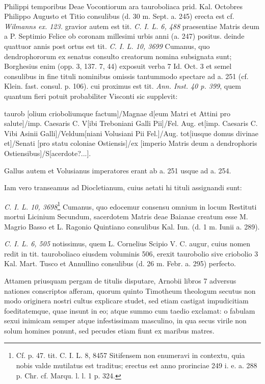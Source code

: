 \documentclass[a4paper, 11pt, oneside, polutonikogreek, german, twocolumn]{article}
\begin{document}
\paragraph{}
Philippi temporibus Deae Vocontiorum ara tauroboliaca prid. Kal. Octobres Philippo Augusto et Titio consulibus (d. 30 m. Sept. a. 245) erecta est cf. \emph{Wilmanns ex. 123.} gravior autem est tit. \emph{C. I. L. 6, 488} praesentiae Matris deum a P. Septimio Felice ob coronam millesimi urbis anni (a. 247) positus. deinde quattuor annis post ortus est tit. \emph{C. I. L. 10, 3699} Cumanus, quo dendrophororum ex senatus consulto creatorum nomina subsignata sunt; Borghesius enim (opp. 3, 137. 7, 44) exposuit verba 7 Id. Oct. 3 et semel consulibus in fine tituli nominibus omissis tantummodo spectare ad a. 251 (cf. Klein. fast. consul. p. 106). cui proximus est tit. \emph{Ann. Inst. 40 p. 399}, quem quantum fieri potuit probabiliter Visconti sic supplevit:

taurob [olium crioboliumque factum]/Magnae d[eum Matri et Attini pro salute]/imp. Caesaris C. V[ibi Treboniani Galli Pii]/Fel. Aug. et[imp. Caesaris C. Vibi Asinii Galli]/Veldum[niani Volusiani Pii Fel.]/Aug. tot[iusque domus divinae et]/Senati [pro statu coloniae Ostiensis]/ex [imperio Matris deum a dendrophoris Ostiensibus]/S[acerdote?...].

Gallus autem et Volusianus imperatores erant ab a. 251 usque ad a. 254.

Iam vero transeamus ad Diocletianum, cuius aetati hi tituli assignandi sunt:

\emph{C. I. L. 10, 3698}\footnote{Cf. p. 47. tit. C. I. L. 8, 8457 Sitifensem non enumeravi in contextu, quia nobis valde mutilatus est traditus; erectus est anno prorinciae 249 i. e. a. 288 p. Chr. cf. Marqu. l. l. 1 p. 324.} Cumanus, quo edocemur consensu omnium in locum Restituti mortui Licinium Secundum, sacerdotem Matris deae Baianae creatum esse M. Magrio Basso et L. Ragonio Quintiano consulibus Kal. Iun. (d. 1 m. Iunii a. 289).

\emph{C. I. L. 6, 505} notissimus, quem L. Cornelius Scipio V. C. augur, cuius nomen redit in tit. tauroboliaco eiusdem voluminis 506, erexit taurobolio sive criobolio 3 Kal. Mart. Tusco et Annullino consulibus (d. 26 m. Febr. a. 295) perfecto.

Attamen priusquam pergam de titulis disputare, Arnobii libros 7 adversus nationes conscriptos afferam, quorum quinto Timotheum theologum secutus non modo originera nostri cultus explicare studet, sed etiam castigat impudicitiam foeditatemque, quae insunt in eo; atque summo cum taedio exclamat: o fabulam sexui inimicam semper atque infestissimam masculino, in qua secus virile non solum homines ponunt, sed pecudes etiam fiunt ex maribus matres.
\end{document}
